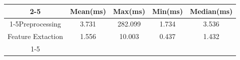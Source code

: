 \documentclass{standalone}
\begin{document}
 
 \begin{tabular}{|c |c |c |c |c |}
\cline{2-5}\cline{2-5} \multicolumn{1}{c |}{ } & Mean(ms) & Max(ms) & Min(ms) & Median(ms)\\ 
\cline{1-5}Preprocessing & 3.731 & 282.099 & 1.734 & 3.536\\ 
 \hhline{|=|=|=|=|=|}Feature Extaction & 1.556 & 10.003 & 0.437 & 1.432\\ 
 \cline{1-5}\hline \end{tabular}
 
\end{document}
